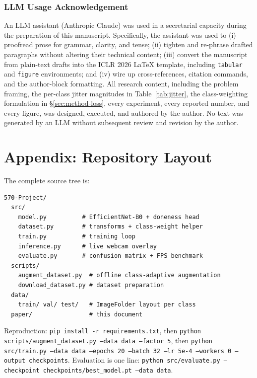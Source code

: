 \documentclass{article}
\begin{document}
\subsubsection*{LLM Usage Acknowledgement}
An LLM assistant (Anthropic Claude) was used in a secretarial capacity during
the preparation of this manuscript. Specifically, the assistant was used to
(i) proofread prose for grammar, clarity, and tense;
(ii) tighten and re-phrase drafted paragraphs without altering their technical
content; (iii) convert the manuscript from plain-text drafts into the ICLR
2026 \LaTeX{} template, including \texttt{tabular} and \texttt{figure}
environments; and (iv) wire up cross-references, citation commands, and the
author-block formatting. All research content, including the problem framing,
the per-class jitter magnitudes in Table~\ref{tab:jitter}, the class-weighting
formulation in \S\ref{sec:method-loss}, every experiment, every reported
number, and every figure, was designed, executed, and authored by the
author. No text was generated by an LLM without subsequent review and
revision by the author.




\appendix
\section{Appendix: Repository Layout}

The complete source tree is:

\begin{verbatim}
570-Project/
  src/
    model.py          # EfficientNet-B0 + doneness head
    dataset.py        # transforms + class-weight helper
    train.py          # training loop
    inference.py      # live webcam overlay
    evaluate.py       # confusion matrix + FPS benchmark
  scripts/
    augment_dataset.py  # offline class-adaptive augmentation
    download_dataset.py # dataset preparation
  data/
    train/ val/ test/   # ImageFolder layout per class
  paper/                # this document
\end{verbatim}

Reproduction: \texttt{pip install -r requirements.txt}, then
\texttt{python scripts/augment\_dataset.py --data data --factor 5}, then
\texttt{python src/train.py --data data --epochs 20 --batch 32 --lr 5e-4
--workers 0 --output checkpoints}. Evaluation is one line:
\texttt{python src/evaluate.py --checkpoint checkpoints/best\_model.pt
--data data}.
\end{document}
